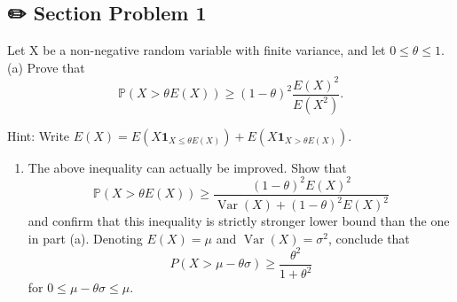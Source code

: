 \documentclass[
  letterpaper,
  DIV=11,
  numbers=noendperiod]{scrreprt}
\providecommand{\tightlist}{%
  \setlength{\itemsep}{0pt}\setlength{\parskip}{0pt}}\usepackage{longtable,booktabs,array}
\theoremstyle{definition}
\theoremstyle{plain}
\theoremstyle{remark}
\begin{document}

\hypertarget{section-problem-1-6}{%
\subsection*{✏️ Section Problem 1}\label{section-problem-1-6}}

Let \(\mathrm{X}\) be a non-negative random variable with finite
variance, and let \(0 \leq \theta \leq 1\). (a) Prove that \[
\mathbb{P}(X>\theta E(X)) \geq(1-\theta)^2 \frac{E(X)^2}{E\left(X^2\right)} .
\]

Hint: Write
\(E(X)=E\left(X \mathbf{1}_{X \leq \theta E(X)}\right)+E\left(X \mathbf{1}_{X>\theta E(X)}\right)\).

\begin{enumerate}
\def\labelenumi{(\alph{enumi})}
\setcounter{enumi}{1}
\tightlist
\item
  The above inequality can actually be improved. Show that \[
  \mathbb{P}(X>\theta E(X)) \geq \frac{(1-\theta)^2 E(X)^2}{\operatorname{Var}(X)+(1-\theta)^2 E(X)^2}
  \] and confirm that this inequality is strictly stronger lower bound
  than the one in part (a). Denoting \(E(X)=\mu\) and
  \(\operatorname{Var}(X)=\sigma^2\), conclude that \[
  P(X>\mu-\theta \sigma) \geq \frac{\theta^2}{1+\theta^2}
  \] for \(0 \leq \mu-\theta \sigma \leq \mu\).
\end{enumerate}
\end{document}

